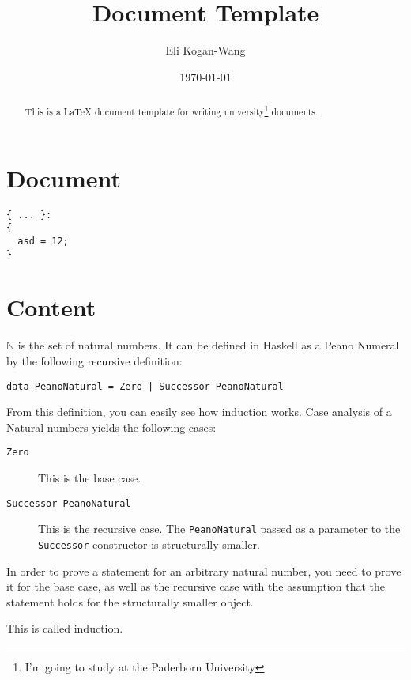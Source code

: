 \documentclass[a4paper,12pt]{article}
\title{Document Template}
\author{Eli Kogan-Wang}
\date{\today}
\begin{document}
\renewcommand{\abstractname}{Abstract}
\begin{abstract}
  This is a LaTeX document template for writing university\footnote{
    I'm going to study at the Paderborn University} documents.
\end{abstract}
\section{Document}
\begin{verbatim}
{ ... }:
{
  asd = 12;
}
\end{verbatim}
\blinddocument
\blindmathpaper

\section{Content}

$\mathbb{N}$ is the set of natural numbers.
It can be defined in Haskell as a Peano Numeral by the following recursive definition:
\begin{verbatim}
data PeanoNatural = Zero | Successor PeanoNatural
\end{verbatim}

From this definition, you can easily see how induction works.
Case analysis of a Natural numbers yields the following cases:

\begin{description}
  \item[\texttt{Zero}] This is the base case.
  \item[\texttt{Successor PeanoNatural}]
    This is the recursive case.
    The \texttt{PeanoNatural} passed as a parameter to the \texttt{Successor} constructor is structurally smaller.
\end{description}


In order to prove a statement for an arbitrary natural number,
you need to prove it for the base case,
as well as the recursive case with the assumption that the statement holds for the structurally smaller object.

This is called induction.
\end{document}
